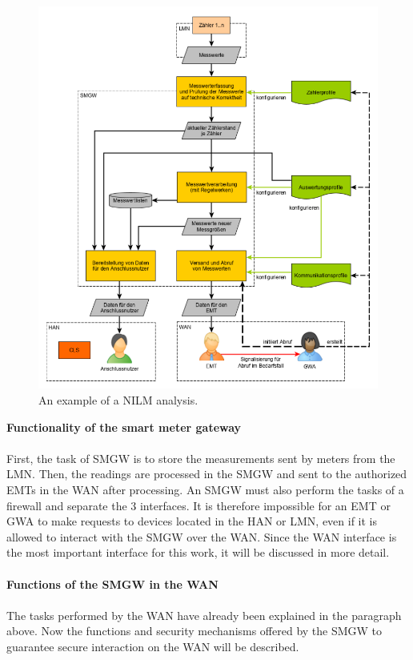 \begin{figure}[tbp]
  \centering
  \includegraphics[width=1\textwidth]{images/Messwertverarbeitung.png}
  \caption[Short description]{An example of a NILM analysis.}
  \label{fig:Appliance_Model}
\end{figure}
\textbf{Functionality of the smart meter gateway}
\\
\\
First, the task of SMGW is to store the measurements sent by meters from the LMN. Then, the readings are processed in the SMGW and sent to the authorized EMTs in the WAN after processing. An SMGW must also perform the tasks of a firewall and separate the 3 interfaces. It is therefore impossible for an EMT or GWA to make requests to devices located in the HAN or LMN, even if it is allowed to interact with the SMGW over the WAN.
Since the WAN interface is the most important interface for this work, it will be discussed in more detail.\\
\\
\textbf{Functions of the SMGW in the WAN}
\\
\\
The tasks performed by the WAN have already been explained in the paragraph above. Now the functions and security mechanisms offered by the SMGW to guarantee secure interaction on the WAN will be described.
